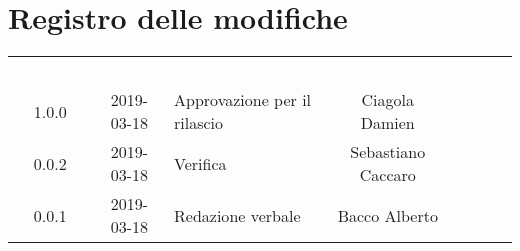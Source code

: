 \section*{Registro delle modifiche}
{
	\renewcommand{\arraystretch}{1.5}
	\centering
	\begin{longtable}{ c c  C{4cm}  c  c }
		
		\textcolor{white}{\textbf{Versione}} & \textcolor{white}{\textbf{Data}} & \textcolor{white}{\textbf{Descrizione}} & \textcolor{white}{\textbf{Autore}} & \textcolor{white}{\textbf{Ruolo}}\\
		1.0.0 & 2019-03-18 & Approvazione per il rilascio & Ciagola Damien & \Res{}\\
		0.0.2 & 2019-03-18 & Verifica & Sebastiano Caccaro & \ver{}\\
		0.0.1 & 2019-03-18 & Redazione verbale & Bacco Alberto & \reda{}\\
		
		
	\end{longtable}
	
}